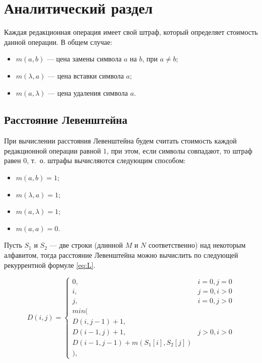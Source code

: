 \chapter{Аналитический раздел}

Каждая редакционная операция имеет свой штраф, который определяет стоимость данной операции. В общем случае:
\begin{itemize}
	\item $ m(a, b) $ --- цена замены символа $ a $ на $ b $, при $ a \ne b $;
	\item $ m(\lambda, a) $ --- цена вставки символа $ a $;
	\item $ m(a, \lambda) $ --- цена удаления символа $ a $.
\end{itemize}


\section{Расстояние Левенштейна}

При вычислении расстояния Левенштейна будем считать стоимость каждой редакционной операции равной $ 1 $, при этом, если символы совпадают, то штраф равен $0$, т.~о. штрафы вычисляются следующим способом:
\begin{itemize}
	\item $ m(a, b) = 1 $;
	\item $ m(\lambda, a) = 1 $;
	\item $ m(a, \lambda) = 1 $;
	\item $ m(a, a) = 0 $.
\end{itemize}

Пусть $S_1$ и $S_2$ --- две строки (длинной $M$ и $N$ соответственно) над некоторым алфавитом, тогда расстояние Левенштейна можно вычислить по следующей рекуррентной формуле \eqref{eq:L}.

\begin{equation}
	\label{eq:L}
	D(i,j) = \left\{ \begin{array}{ll}
		0, & \textrm{$i = 0, j = 0$}\\
		i, & \textrm{$j = 0, i > 0$}\\
		j, & \textrm{$i = 0, j > 0$}\\
		min(\\
		D(i,j-1)+1,\\
		D(i-1, j) +1, &\textrm{$j>0, i>0$}\\
		D(i-1, j-1) + m(S_{1}[i], S_{2}[j])\\
		),
	\end{array} \right.
\end{equation}

